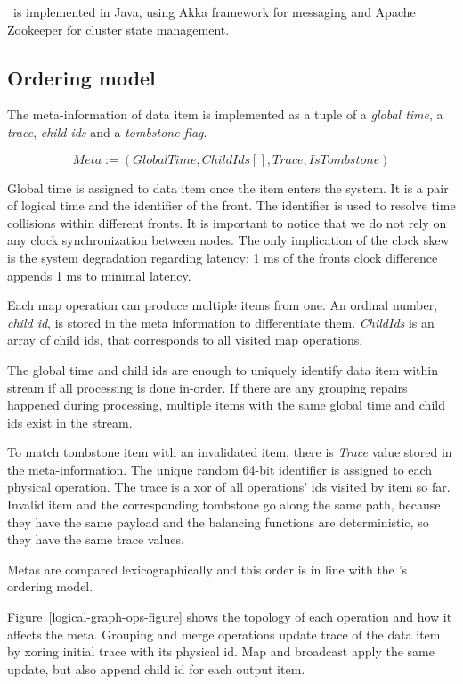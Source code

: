 \label{fs-impl}

\FlameStream\ is implemented in Java, using Akka framework for messaging and Apache Zookeeper for cluster state management.

\subsection{Ordering model}
The meta-information of data item is implemented as a tuple of a {\it global time}, a {\it trace}, {\it child ids} and a {\it tombstone flag}.

\[Meta := (GlobalTime, ChildIds[], Trace, IsTombstone)\]

Global time is assigned to data item once the item enters the system. It is a pair of logical time and the identifier of the front. The identifier is used to resolve time collisions within different fronts. It is important to notice that we do not rely on any clock synchronization between nodes. The only implication of the clock skew is the system degradation regarding latency: 1 ms of the fronts clock difference appends 1 ms to minimal latency.

Each map operation can produce multiple items from one.  An ordinal number, {\it child id}, is stored in the meta information to differentiate them. {\it ChildIds} is an array of child ids, that corresponds to all visited map operations.

The global time and child ids are enough to uniquely identify data item within stream if all processing is done in-order. If there are any grouping repairs happened during processing, multiple items with the same global time and child ids exist in the stream. 

To match tombstone item with an invalidated item, there is {\it Trace} value stored in the meta-information. The unique random 64-bit identifier is assigned to each physical operation. The trace is a xor of all operations' ids visited by item so far. Invalid item and the corresponding tombstone go along the same path, because they have the same payload and the balancing functions are deterministic, so they have the same trace values.

Metas are compared lexicographically and this order is in line with the \FlameStream's ordering model.

Figure~\ref{logical-graph-ops-figure} shows the topology of each operation and how it affects the meta. Grouping and merge operations update trace of the data item by xoring initial trace with its physical id. Map and broadcast apply the same update, but also append child id for each output item.

